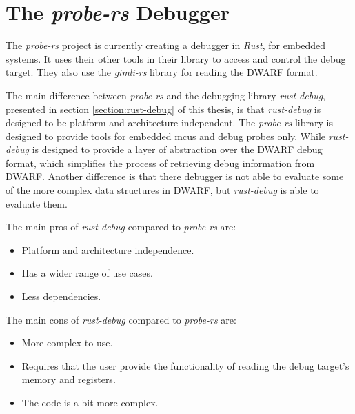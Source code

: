 \section{The \emph{probe-rs} Debugger}

The \emph{probe-rs} project is currently creating a debugger in \emph{Rust}, for embedded systems.
It uses their other tools in their library to access and control the debug target.
They also use the \emph{gimli-rs} library for reading the \gls{DWARF} format.


The main difference between \emph{probe-rs} and the debugging library \emph{rust-debug}, presented in section \ref{section:rust-debug} of this thesis, is that \emph{rust-debug} is designed to be platform and architecture independent.
The \emph{probe-rs} library is designed to provide tools for embedded \glspl{mcu} and debug probes only.
While \emph{rust-debug} is designed to provide a layer of abstraction over the \gls{DWARF} debug format, which simplifies the process of retrieving debug information from \gls{DWARF}.
Another difference is that there debugger is not able to evaluate some of the more complex data structures in \gls{DWARF}, but \emph{rust-debug} is able to evaluate them.

The main pros of \emph{rust-debug} compared to \emph{probe-rs} are:
\begin{itemize}
  \item Platform and architecture independence.
  \item Has a wider range of use cases.
  \item Less dependencies.
\end{itemize}

The main cons of \emph{rust-debug} compared to \emph{probe-rs} are:
\begin{itemize}
  \item More complex to use.
  \item Requires that the user provide the functionality of reading the debug target's memory and registers.
  \item The code is a bit more complex.
\end{itemize}





